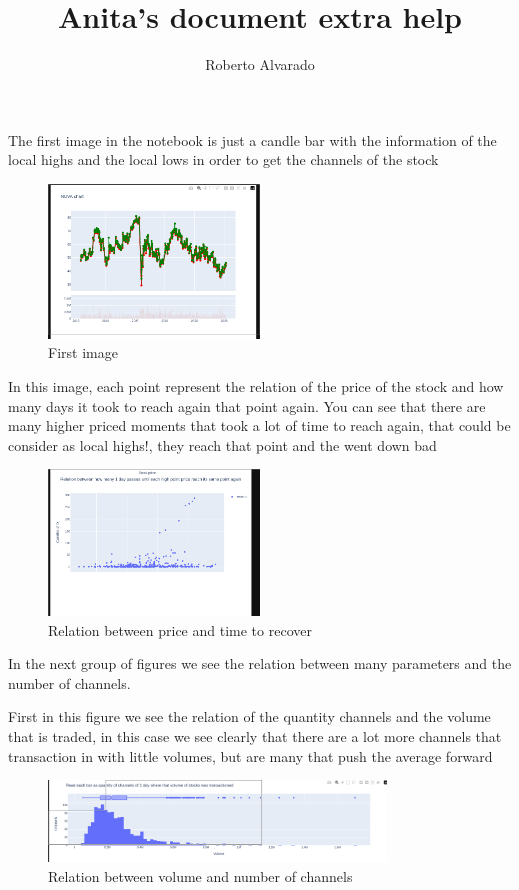 \documentclass{article}
\title{Anita's document extra help}
\author{Roberto Alvarado}
\begin{document}
\maketitle
The first image in the notebook is just a candle bar with the information of the
local highs and the local lows in order to get the channels of the stock
\begin{figure}[h]
  \caption{First image}
  \begin{center}
    \includegraphics[width=0.5\textwidth]{figures/2.png}
  \end{center}
\end{figure}
In this image, each point represent the relation of the price of the stock and
how many days it took to reach again that point again. You can see that there
are many higher priced moments that took a lot of time to reach again, that
could be consider as local highs!, they reach that point and the went down bad 
\begin{figure}[h]
  \caption{Relation between price and time to recover}
  \begin{center}
    \includegraphics[width=0.5\textwidth]{figures/1.png}
  \end{center}
\end{figure}
\newpage
In the next group of figures we see the relation between many parameters and the
number of channels.

First in this figure we see the relation of the quantity channels and the
volume that is traded, in this case we see clearly that there are a lot more
channels that transaction in with little volumes, but are many that push the
average forward
\begin{figure}[h]
  \caption{Relation between volume and number of channels}
  \begin{center}
    \includegraphics[width=0.8\textwidth]{figures/2023-05-25-142825_1444x349_scrot.png}
  \end{center}
\end{figure}
\end{document}
